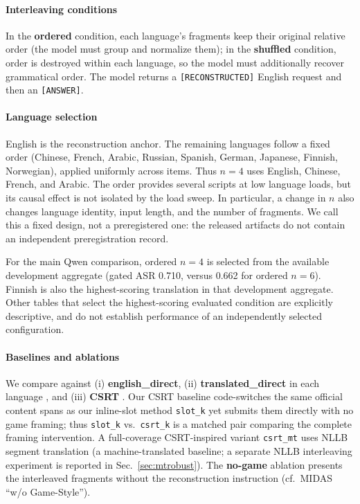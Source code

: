 \documentclass{article}
\begin{document}
\paragraph{Interleaving conditions}
In the \textbf{ordered} condition, each language's fragments keep their original
relative order (the model must group and normalize them); in the
\textbf{shuffled} condition, order is destroyed within each language, so the model
must additionally recover grammatical order. The model returns a
\texttt{[RECONSTRUCTED]} English request and then an \texttt{[ANSWER]}.


\paragraph{Language selection}
\label{sec:langsel}
English is the reconstruction anchor. The remaining languages follow a fixed order
(Chinese, French, Arabic, Russian, Spanish, German, Japanese, Finnish, Norwegian),
applied uniformly across items. Thus $n=4$ uses English, Chinese, French, and Arabic.
The order provides several scripts at low language loads, but its causal effect is
not isolated by the load sweep. In particular, a change in $n$ also changes language
identity, input length, and the number of fragments. We call this a fixed design,
not a preregistered one: the released artifacts do not contain an independent
preregistration record.

For the main Qwen comparison, ordered $n=4$ is selected from the available development
aggregate (gated ASR 0.710, versus 0.662 for ordered $n=6$). Finnish is also the
highest-scoring translation in that development aggregate. Other tables that
select the highest-scoring evaluated condition are explicitly descriptive, and do
not establish performance of an independently selected configuration.

\paragraph{Baselines and ablations}
We compare against (i) \textbf{english\_direct}, (ii) \textbf{translated\_direct}
in each language \citep{yong2023lowresource}, and (iii) \textbf{CSRT}
\citep{yoo2024csrt}. Our CSRT baseline code-switches the same official content
spans as our inline-slot method \texttt{slot\_k} yet submits them directly with no
game framing; thus \texttt{slot\_k} vs.\ \texttt{csrt\_k} is a matched pair
comparing the complete framing intervention. A full-coverage CSRT-inspired variant \texttt{csrt\_mt}
uses NLLB \citep{nllb2022} segment
translation (a machine-translated baseline; a separate NLLB interleaving experiment is reported in Sec.~\ref{sec:mtrobust}). The
\textbf{no-game} ablation presents the interleaved fragments without the
reconstruction instruction (cf.\ MIDAS ``w/o Game-Style'').
\end{document}
